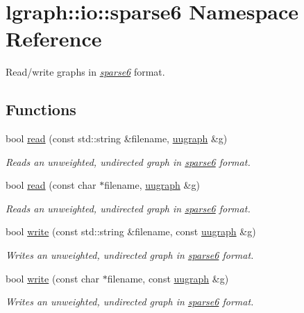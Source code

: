 \hypertarget{namespacelgraph_1_1io_1_1sparse6}{}\section{lgraph\+:\+:io\+:\+:sparse6 Namespace Reference}
\label{namespacelgraph_1_1io_1_1sparse6}


Read/write graphs in {\itshape \hyperlink{namespacelgraph_1_1io_1_1sparse6}{sparse6}} format.  


\subsection*{Functions}
\begin{DoxyCompactItemize}
\item 
bool \hyperlink{namespacelgraph_1_1io_1_1sparse6_aef4d5e701991e80d99482b20018b03d4}{read} (const std\+::string \&filename, \hyperlink{classlgraph_1_1uugraph}{uugraph} \&g)
\begin{DoxyCompactList}\small\item\em Reads an unweighted, undirected graph in {\itshape \hyperlink{namespacelgraph_1_1io_1_1sparse6}{sparse6}} format. \end{DoxyCompactList}\item 
bool \hyperlink{namespacelgraph_1_1io_1_1sparse6_ae96a7c49cd0f6b70eb6ae23dc18d8588}{read} (const char $\ast$filename, \hyperlink{classlgraph_1_1uugraph}{uugraph} \&g)
\begin{DoxyCompactList}\small\item\em Reads an unweighted, undirected graph in {\itshape \hyperlink{namespacelgraph_1_1io_1_1sparse6}{sparse6}} format. \end{DoxyCompactList}\item 
bool \hyperlink{namespacelgraph_1_1io_1_1sparse6_a4727f803d03a747416ce43acf4cfbb59}{write} (const std\+::string \&filename, const \hyperlink{classlgraph_1_1uugraph}{uugraph} \&g)
\begin{DoxyCompactList}\small\item\em Writes an unweighted, undirected graph in {\itshape \hyperlink{namespacelgraph_1_1io_1_1sparse6}{sparse6}} format. \end{DoxyCompactList}\item 
bool \hyperlink{namespacelgraph_1_1io_1_1sparse6_a851ea580cd4dd91e6239caa76f74b887}{write} (const char $\ast$filename, const \hyperlink{classlgraph_1_1uugraph}{uugraph} \&g)
\begin{DoxyCompactList}\small\item\em Writes an unweighted, undirected graph in {\itshape \hyperlink{namespacelgraph_1_1io_1_1sparse6}{sparse6}} format. \end{DoxyCompactList}\end{DoxyCompactItemize}


